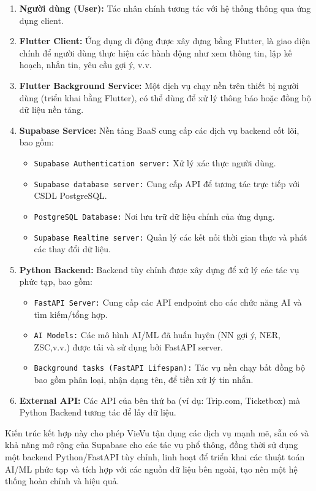 \begin{enumerate}
    \item \textbf{Người dùng (User):} Tác nhân chính tương tác với hệ thống thông qua ứng dụng client.
    \item \textbf{Flutter Client:} Ứng dụng di động được xây dựng bằng Flutter, là giao diện chính để người dùng thực hiện các hành động như xem thông tin, lập kế hoạch, nhắn tin, yêu cầu gợi ý, v.v.
    \item \textbf{Flutter Background Service:} Một dịch vụ chạy nền trên thiết bị người dùng (triển khai bằng Flutter), có thể dùng để xử lý thông báo hoặc đồng bộ dữ liệu nền tảng.
    \item \textbf{Supabase Service:} Nền tảng BaaS cung cấp các dịch vụ backend cốt lõi, bao gồm:
        \begin{itemize}
            \item \texttt{Supabase Authentication server:} Xử lý xác thực người dùng.
            \item \texttt{Supabase database server:} Cung cấp API để tương tác trực tiếp với CSDL PostgreSQL.
            \item \texttt{PostgreSQL Database:} Nơi lưu trữ dữ liệu chính của ứng dụng.
            \item \texttt{Supabase Realtime server:} Quản lý các kết nối thời gian thực và phát các thay đổi dữ liệu.
        \end{itemize}
    \item \textbf{Python Backend:} Backend tùy chỉnh được xây dựng để xử lý các tác vụ phức tạp, bao gồm:
        \begin{itemize}
            \item \texttt{FastAPI Server:} Cung cấp các API endpoint cho các chức năng AI và tìm kiếm/tổng hợp.
            \item \texttt{AI Models:} Các mô hình AI/ML đã huấn luyện (NN gợi ý, NER, ZSC,v.v.) được tải và sử dụng bởi FastAPI server.
            \item \texttt{Background tasks (FastAPI Lifespan):} Tác vụ nền chạy bất đồng bộ bao gồm phân loại, nhận dạng tên, để tiền xử lý tin nhắn.
        \end{itemize}
    \item \textbf{External API:} Các API của bên thứ ba (ví dụ: Trip.com, Ticketbox) mà Python Backend tương tác để lấy dữ liệu.
\end{enumerate}




\noindent Kiến trúc kết hợp này cho phép VieVu tận dụng các dịch vụ mạnh mẽ, sẵn có và khả năng mở rộng của Supabase cho các tác vụ phổ thông, đồng thời sử dụng một backend Python/FastAPI tùy chỉnh, linh hoạt để triển khai các thuật toán AI/ML phức tạp và tích hợp với các nguồn dữ liệu bên ngoài, tạo nên một hệ thống hoàn chỉnh và hiệu quả.
